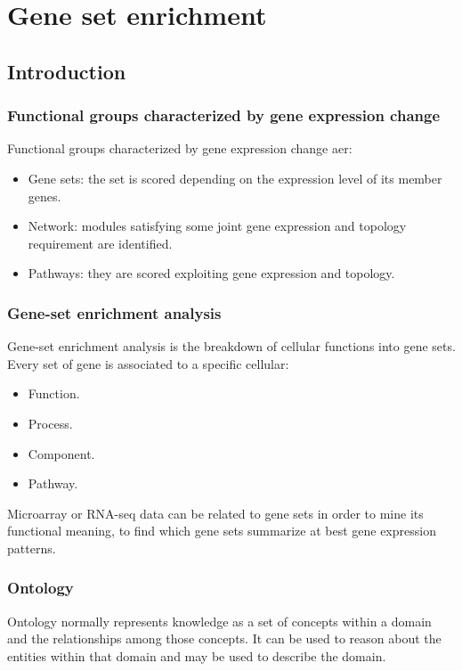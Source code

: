 \graphicspath{{chapters/06/images/}}
\chapter{Gene set enrichment}

\section{Introduction}

	\subsection{Functional groups characterized by gene expression change}
	Functional groups characterized by gene expression change aer:

	\begin{multicols}{2}
		\begin{itemize}
			\item Gene sets: the set is scored depending on the expression level of its member genes.
			\item Network: modules satisfying some joint gene expression and topology requirement are identified.
			\item Pathways: they are scored exploiting gene expression and topology.
		\end{itemize}
	\end{multicols}

	\subsection{Gene-set enrichment analysis}
	Gene-set enrichment analysis is the breakdown of cellular functions into gene sets.
	Every set of gene is associated to a specific cellular:

	\begin{multicols}{4}
		\begin{itemize}
			\item Function.
			\item Process.
			\item Component.
			\item Pathway.
		\end{itemize}
	\end{multicols}

	Microarray or RNA-seq data can be related to gene sets in order to mine its functional meaning, to find which gene sets summarize at best gene expression patterns.

	\subsection{Ontology}
	Ontology normally represents knowledge as a set of concepts within a domain and the relationships among those concepts.
	It can be used to reason about the entities within that domain and may be used to describe the domain.

